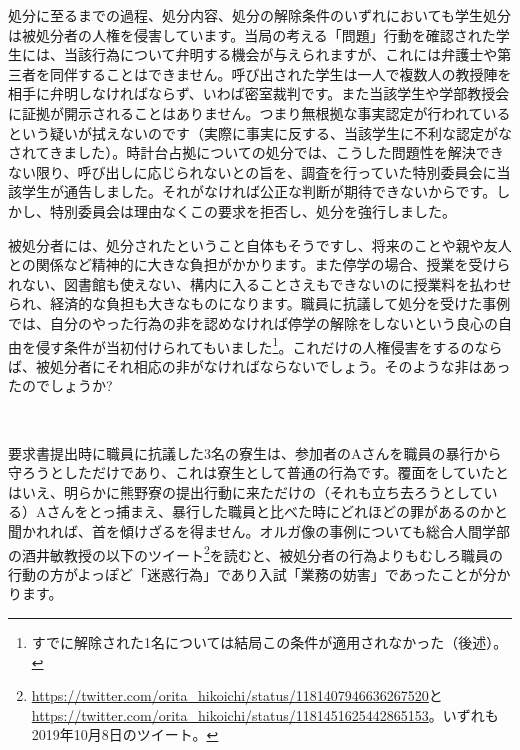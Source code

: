 \vspace{4mm}
\noindent{}

処分に至るまでの過程、処分内容、処分の解除条件のいずれにおいても学生処分は被処分者の人権を侵害しています。当局の考える「問題」行動を確認された学生には、当該行為について弁明する機会が与えられますが、これには弁護士や第三者を同伴することはできません。呼び出された学生は一人で複数人の教授陣を相手に弁明しなければならず、いわば密室裁判です。また当該学生や学部教授会に証拠が開示されることはありません。つまり無根拠な事実認定が行われているという疑いが拭えないのです（実際に事実に反する、当該学生に不利な認定がなされてきました）。時計台占拠についての処分では、こうした問題性を解決できない限り、呼び出しに応じられないとの旨を、調査を行っていた特別委員会に当該学生が通告しました。それがなければ公正な判断が期待できないからです。しかし、特別委員会は理由なくこの要求を拒否し、処分を強行しました。

被処分者には、処分されたということ自体もそうですし、将来のことや親や友人との関係など精神的に大きな負担がかかります。また停学の場合、授業を受けられない、図書館も使えない、構内に入ることさえもできないのに授業料を払わせられ、経済的な負担も大きなものになります。職員に抗議して処分を受けた事例では、自分のやった行為の非を認めなければ停学の解除をしないという良心の自由を侵す条件が当初付けられてもいました\footnote{すでに解除された1名については結局この条件が適用されなかった（後述）。}。これだけの人権侵害をするのならば、被処分者にそれ相応の非がなければならないでしょう。そのような非はあったのでしょうか?

\vspace{4mm}
\noindent{}\ \ 

要求書提出時に職員に抗議した3名の寮生は、参加者のAさんを職員の暴行から守ろうとしただけであり、これは寮生として普通の行為です。覆面をしていたとはいえ、明らかに熊野寮の提出行動に来ただけの（それも立ち去ろうとしている）Aさんをとっ捕まえ、暴行した職員と比べた時にどれほどの罪があるのかと聞かれれば、首を傾けざるを得ません。オルガ像の事例についても総合人間学部の酒井敏教授の以下のツイート\footnote{\url{https://twitter.com/orita_hikoichi/status/1181407946636267520}と\url{https://twitter.com/orita_hikoichi/status/1181451625442865153}。いずれも2019年10月8日のツイート。}を読むと、被処分者の行為よりもむしろ職員の行動の方がよっぽど「迷惑行為」であり入試「業務の妨害」であったことが分かります。

